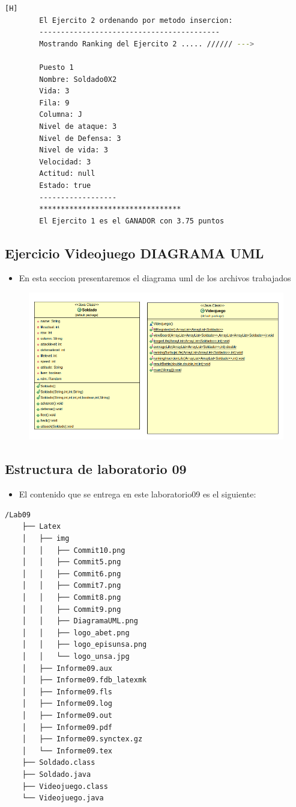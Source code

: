 \documentclass{article}
\begin{document}
\begin{lstlisting}[language=bash,caption={Ejecucion:}][H]
		El Ejercito 2 ordenando por metodo insercion: 
		------------------------------------------
		Mostrando Ranking del Ejercito 2 ..... ////// --->

		Puesto 1
		Nombre: Soldado0X2
		Vida: 3
		Fila: 9
		Columna: J
		Nivel de ataque: 3
		Nivel de Defensa: 3
		Nivel de vida: 3
		Velocidad: 3
		Actitud: null
		Estado: true
		------------------
		*********************************
		El Ejercito 1 es el GANADOR con 3.75 puntos

	\end{lstlisting}
	\subsection{Ejercicio Videojuego DIAGRAMA UML}
	\begin{itemize}	
		\item En esta seccion presentaremos el diagrama uml de los archivos trabajados
	\end{itemize}
	\begin{figure}[H]
		\centering
		\includegraphics[width=1.0\textwidth,keepaspectratio]{img/DiagramaUML.png}
	\end{figure}
	\subsection{Estructura de laboratorio 09}
	\begin{itemize}	
		\item El contenido que se entrega en este laboratorio09 es el siguiente:
	\end{itemize}
	\begin{lstlisting}[style=ascii-tree]
	/Lab09	
	├── Latex
	│   ├── img
	│   │   ├── Commit10.png
	│   │   ├── Commit5.png
	│   │   ├── Commit6.png
	│   │   ├── Commit7.png
	│   │   ├── Commit8.png
	│   │   ├── Commit9.png
	│   │   ├── DiagramaUML.png
	│   │   ├── logo_abet.png
	│   │   ├── logo_episunsa.png
	│   │   └── logo_unsa.jpg
	│   ├── Informe09.aux
	│   ├── Informe09.fdb_latexmk
	│   ├── Informe09.fls
	│   ├── Informe09.log
	│   ├── Informe09.out
	│   ├── Informe09.pdf
	│   ├── Informe09.synctex.gz
	│   └── Informe09.tex
	├── Soldado.class
	├── Soldado.java
	├── Videojuego.class
	└── Videojuego.java

	\end{lstlisting}    
\end{document}
